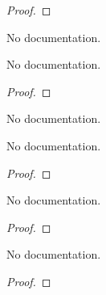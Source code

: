 \begin{proof}
    \leanok
\end{proof}

\begin{theorem}\label{varphi_negone_eq_negone}
                No documentation.
    \end{theorem}

\begin{theorem}\label{psi_zero_eq_zero}
        \leanok
                No documentation.
    \end{theorem}

\begin{proof}
    \leanok
\end{proof}

\begin{theorem}\label{Varphi_eq_Sum_Inf}
                No documentation.
    \end{theorem}

\begin{theorem}\label{HerbrandFunction.sub_of_sum}
        \leanok
                No documentation.
    \end{theorem}

\begin{proof}
    \leanok
\end{proof}

\begin{theorem}\label{HerbrandFunction.ceil_eq_floor_add_one_iff}
        \leanok
                No documentation.
    \end{theorem}

\begin{proof}
    \leanok
\end{proof}

\begin{theorem}\label{HerbrandFunction.Int.eq_of_ge_of_lt_add_one}
        \leanok
                No documentation.
    \end{theorem}

\begin{proof}
    \leanok
\end{proof}

